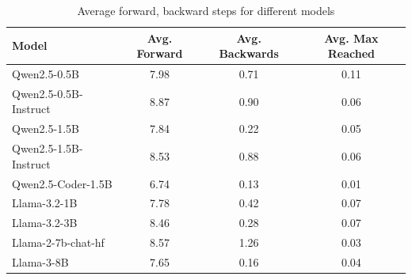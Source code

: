 \begin{table}[ht]
    \centering
    \scriptsize
    \caption{Average forward, backward steps for different models}
    \begin{tabular}{lccc}
        \toprule
        \textbf{Model} & \textbf{Avg. Forward} & \textbf{Avg. Backwards} & \textbf{Avg. Max Reached} \\
        \midrule
        Qwen2.5-0.5B & 7.98 & 0.71 & 0.11 \\
        Qwen2.5-0.5B-Instruct & 8.87 & 0.90 & 0.06 \\
        Qwen2.5-1.5B & 7.84 & 0.22 & 0.05 \\
        Qwen2.5-1.5B-Instruct & 8.53 & 0.88 & 0.06 \\
        Qwen2.5-Coder-1.5B & 6.74 & 0.13 & 0.01 \\
        Llama-3.2-1B & 7.78 & 0.42 & 0.07 \\
        Llama-3.2-3B & 8.46 & 0.28 & 0.07 \\
        Llama-2-7b-chat-hf & 8.57 & 1.26 & 0.03 \\
        Llama-3-8B & 7.65 & 0.16 & 0.04 \\
        \bottomrule
    \end{tabular}
    \label{tab:avg_forward_backward}
\end{table}


